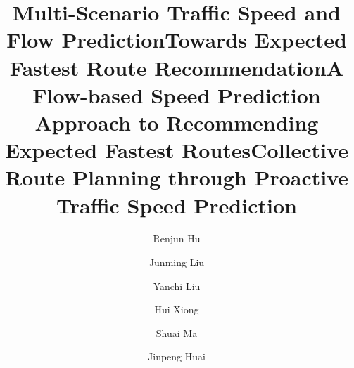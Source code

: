 \documentclass[acmlarge]{acmart}
\newcommand{\eat}[1]{}
\begin{document}
\title{Multi-Scenario Traffic Speed and Flow Prediction}

\title{Towards Expected Fastest Route Recommendation}

\title{A Flow-based Speed Prediction Approach to Recommending Expected Fastest Routes}

\title{Collective Route Planning through Proactive Traffic Speed Prediction}


\author{Renjun Hu}
\author{Junming Liu}
\author{Yanchi Liu}
\author{Hui Xiong}
\author{Shuai Ma}
\author{Jinpeng Huai}






\eat{   %
\author{
Renjun Hu$^{1,2}$, Junming Liu$^3$, Hui Xiong$^3$, Shuai Ma$^{1,2}$, Jinpeng Huai$^{1,2}$}
\affiliation{%
  \institution{$^1$ SKLSDE Lab, Beihang University, China}
  \institution{$^2$ Beijing Advanced Innovation Center for Big Data and Brain Computing, China}
  \institution{$^3$ Rutgers University, USA}
  \institution{\{hurenjun, mashuai, huaijp\}@buaa.edu.cn \hspace{12ex} \{jl1433, hxiong\}@rutgers.edu}
}
}%
\end{document}
